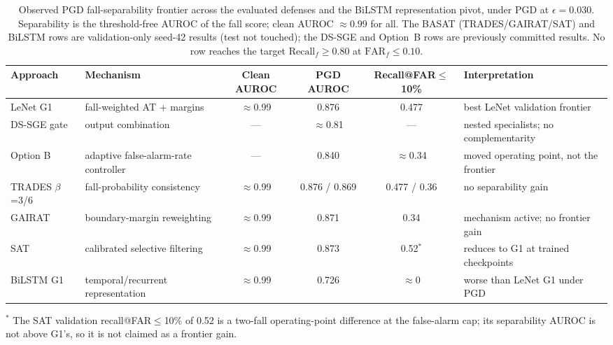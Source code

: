 \begin{table}[H]
\centering
\footnotesize
\caption{Observed PGD fall-separability frontier across the evaluated defenses and the BiLSTM
representation pivot, under PGD at \(\epsilon=0.030\). Separability is the threshold-free AUROC of the fall
score; clean AUROC \(\approx 0.99\) for all. The BASAT (TRADES/GAIRAT/SAT) and BiLSTM rows are validation-only
seed-42 results (test not touched); the DS-SGE and Option~B rows are previously committed results. No row
reaches the target \(\mathrm{Recall}_f\geq 0.80\) at \(\mathrm{FAR}_f\leq 0.10\).}
\label{tab:ch6-frontier-synthesis}
\begin{tabular}{p{}p{}cccp{}}
\hline
Approach & Mechanism & Clean AUROC & PGD AUROC & Recall@FAR\(\leq\)10\% & Interpretation \\
\hline
LeNet G1 & fall-weighted AT + margins & \(\approx\)0.99 & 0.876 & 0.477 & best LeNet validation frontier \\
DS-SGE gate & output combination & --- & \(\approx\)0.81 & --- & nested specialists; no complementarity \\
Option B & adaptive false-alarm-rate controller & --- & 0.840 & \(\approx\)0.34 & moved operating point, not the frontier \\
TRADES \(\beta\)=3/6 & fall-probability consistency & \(\approx\)0.99 & 0.876 / 0.869 & 0.477 / 0.36 & no separability gain \\
GAIRAT & boundary-margin reweighting & \(\approx\)0.99 & 0.871 & 0.34 & mechanism active; no frontier gain \\
SAT & calibrated selective filtering & \(\approx\)0.99 & 0.873 & 0.52\(^{*}\) & reduces to G1 at trained checkpoints \\
BiLSTM G1 & temporal/recurrent representation & \(\approx\)0.99 & 0.726 & \(\approx\)0 & worse than LeNet G1 under PGD \\
\hline
\end{tabular}

\vspace{2pt}
{\footnotesize \(^{*}\) The SAT validation recall@FAR\(\leq\)10\% of 0.52 is a two-fall operating-point
difference at the false-alarm cap; its separability AUROC is not above G1's, so it is not claimed as a
frontier gain.}
\end{table}

